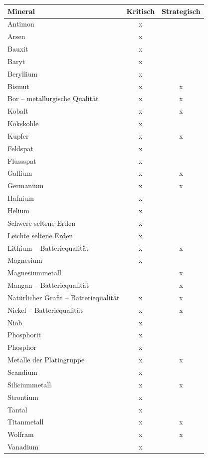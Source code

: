 \documentclass[12pt,a4paper,oneside]{book} %
\begin{document}
\begin{tabular}{|>{\raggedright}p{5cm}|c|c|}
	\hline
	\textbf{Mineral} & \textbf{Kritisch} & \textbf{Strategisch} \\
	\hline
	Antimon & x & \\
	\hline
	Arsen & x & \\
	\hline
	Bauxit & x & \\
	\hline
	Baryt & x & \\
	\hline
	Beryllium & x & \\
	\hline
	Bismut & x & x \\
	\hline
	Bor – metallurgische Qualität & x & x \\
	\hline
	Kobalt & x & x \\
	\hline
	Kokskohle & x & \\
	\hline
	Kupfer & x & x \\
	\hline
	Feldspat & x & \\
	\hline
	Flussspat & x & \\
	\hline
	Gallium & x & x \\
	\hline
	Germanium & x & x \\
	\hline
	Hafnium & x & \\
	\hline
	Helium & x & \\
	\hline
	Schwere seltene Erden & x & \\
	\hline
	Leichte seltene Erden & x & \\
	\hline
	Lithium – Batteriequalität & x & x \\
	\hline
	Magnesium & x & \\
	\hline
	Magnesiummetall & & x \\
	\hline
	Mangan – Batteriequalität & & x \\
	\hline
	Natürlicher Grafit – Batteriequalität & x & x \\
	\hline
	Nickel – Batteriequalität & x & x \\
	\hline
	Niob & x & \\
	\hline
	Phosphorit & x & \\
	\hline
	Phosphor & x & \\
	\hline
	Metalle der Platingruppe & x & x \\
	\hline
	Scandium & x & \\
	\hline
	Siliciummetall & x & x \\
	\hline
	Strontium & x & \\
	\hline
	Tantal & x & \\
	\hline
	Titanmetall & x & x \\
	\hline
	Wolfram & x & x \\
	\hline
	Vanadium & x & \\
	\hline
\end{tabular}
\end{document}
